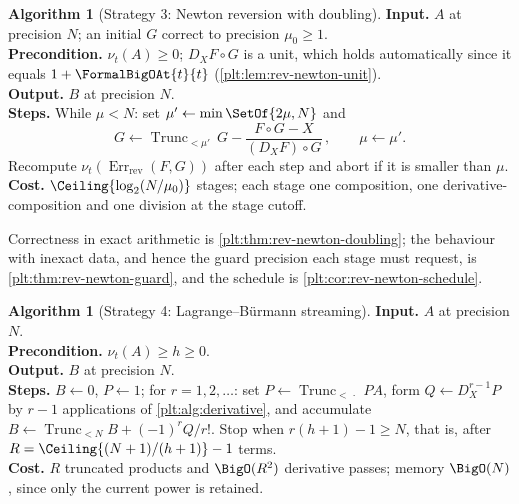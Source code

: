 \documentclass[11pt,oneside]{article}
\theoremstyle{plain}
\theoremstyle{definition}
\newtheorem{algorithm}[theorem]{Algorithm}
\theoremstyle{remark}
\newcommand{\ordt}{\nu_{t}}                              %
\newcommand{\Trunc}[2]{\operatorname{Trunc}_{<#2}#1}     %
\newcommand{\DX}{D_{X}}                                  %
\newcommand{\compose}{\mathbin{\circ}}
\newcommand{\RevErr}[2]{\operatorname{Err}_{\mathrm{rev}}\!\left(#1,#2\right)}
\begin{document}
\begin{algorithm}[Strategy 3: Newton reversion with doubling]
\label{plt:alg:reverse-newton}
\textbf{Input.}  \(A\) at precision \(N\); an initial \(G\) correct to
precision \(\mu_0\ge1\).\\
\textbf{Precondition.}  \(\ordt(A)\ge0\); \(\DX F\compose G\) is a unit, which
holds automatically since it equals \(1+\FormalBigOAt{t}{t}\)
(\cref{plt:lem:rev-newton-unit}).\\
\textbf{Output.}  \(B\) at precision \(N\).\\
\textbf{Steps.}  While \(\mu<N\): set \(\mu'\leftarrow\min\SetOf{2\mu,N}\) and
\[
 G\leftarrow\Trunc{\,G-\frac{F\compose G-X}{(\DX F)\compose G}\,}{\mu'},
 \qquad \mu\leftarrow\mu'.
\]
Recompute \(\ordt(\RevErr{F}{G})\) after each step and abort if it is smaller
than \(\mu\).\\
\textbf{Cost.}  \(\Ceiling{\log_2(N/\mu_0)}\) stages; each stage one
composition, one derivative-composition and one division at the stage cutoff.
\end{algorithm}

Correctness in exact arithmetic is \cref{plt:thm:rev-newton-doubling}; the
behaviour with inexact data, and hence the guard precision each stage must
request, is \cref{plt:thm:rev-newton-guard}, and the schedule is
\cref{plt:cor:rev-newton-schedule}.


\begin{algorithm}[Strategy 4: Lagrange--B\"urmann streaming]
\label{plt:alg:reverse-lagrange}
\textbf{Input.}  \(A\) at precision \(N\).\\
\textbf{Precondition.}  \(\ordt(A)\ge h\ge0\).\\
\textbf{Output.}  \(B\) at precision \(N\).\\
\textbf{Steps.}  \(B\leftarrow0\), \(P\leftarrow1\); for \(r=1,2,\dots\): set
\(P\leftarrow\Trunc{PA}{\,\cdot\,}\), form \(Q\leftarrow\DX^{r-1}P\) by
\(r-1\) applications of \cref{plt:alg:derivative}, and accumulate
\(B\leftarrow\Trunc{B+(-1)^rQ/r!}{N}\).  Stop when
\(r(h+1)-1\ge N\), that is, after
\(R=\Ceiling{(N+1)/(h+1)}-1\) terms.\\
\textbf{Cost.}  \(R\) truncated products and \(\BigO(R^2)\) derivative passes;
memory \(\BigO(N)\), since only the current power is retained.
\end{algorithm}
\end{document}
